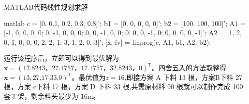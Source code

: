         \begin{codebox}{MATLAB代码}{线性规划求解}
            \begin{amzcode}{matlab}
                c = [0, 0.1, 0.2, 0.3, 0.8]';
                b1 = [0, 0, 0, 0, 0]';
                b2 = [100, 100, 100]';
                A1 = [-1, 0, 0, 0, 0; 0, -1, 0, 0, 0; 0, 0, -1, 0, 0; 0, 0, 0, -1, 0; 0, 0, 0, 0, -1]';
                A2 = [1, 2, 0, 1, 0; 0, 0, 2, 2, 1; 3, 1, 2, 0, 3]';
                [x, fv] = linprog(c, A1, b1, A2, b2);
            \end{amzcode}
        \end{codebox}
        
        运行该程序后，立即可以得到最优解为 $\mathbf{x}=(12.8243\text{，}27.1757\text{，}17.1757\text{，}32.8243\text{，}0)^{\mathrm{T}}$。四舍五入的方法取整得
        $\mathbf{x}=(13,27\text{,}17\text{,}33\text{,}0)^{\mathrm{T}}$。最优值为$z=16$,即接方案 A 下料 13 根，方案B下料 27 根，方案 c下料 17 根，方案 D 下料 33 根,共需原材料 90 根就可以制作完成 100 套工架，剩余料头最少为 16m。

